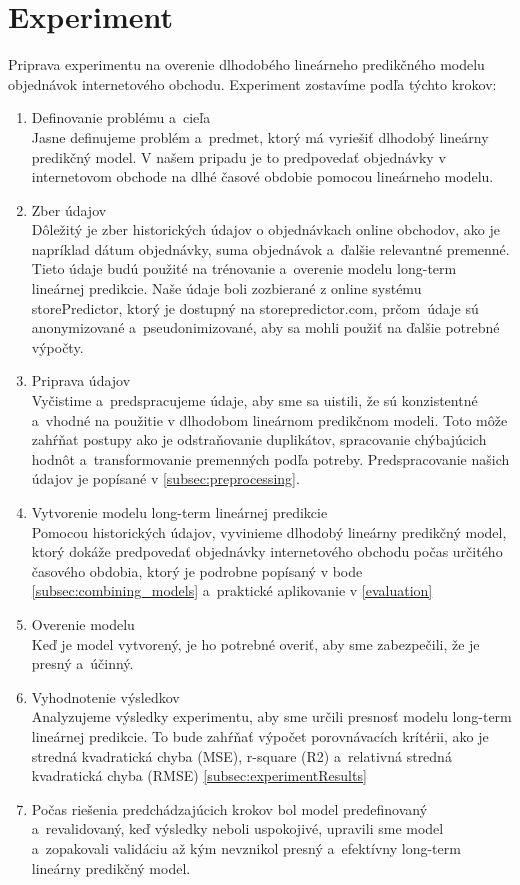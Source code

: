     \section{Experiment}
    Priprava experimentu na overenie dlhodobého lineárneho predikčného modelu objednávok internetového obchodu.
    Experiment zostavíme podľa týchto krokov:
    \begin{enumerate}
        \item Definovanie problému a~cieľa\\
        Jasne definujeme problém a~predmet, ktorý má vyriešiť dlhodobý lineárny\\ predikčný model.
        V našem pripadu je to predpovedať objednávky v internetovom obchode na dlhé časové obdobie
        pomocou lineárneho modelu.
        \item  Zber údajov\\
        Dôležitý je zber historických údajov o objednávkach online obchodov, ako je napríklad
        dátum objednávky, suma objednávok a~ďalšie relevantné premenné. Tieto údaje budú použité na trénovanie a~overenie
        modelu long-term lineárnej predikcie. Naše údaje boli zozbierané z online systému storePredictor,
        ktorý je dostupný na storepredictor.com, prčom~údaje sú anonymizované a~pseudonimizované, aby sa mohli použiť
        na ďalšie potrebné výpočty.
        \item  Priprava údajov\\
        Vyčistime a~predspracujeme údaje, aby sme sa uistili, že sú konzistentné a~vhodné na
        použitie v dlhodobom lineárnom predikčnom modeli. Toto môže zahŕňat postupy ako je odstraňovanie duplikátov,
        spracovanie chýbajúcich hodnôt a~transformovanie premenných podľa potreby. Predspracovanie našich údajov
        je popísané v \ref{subsec:preprocessing}.
        \item  Vytvorenie modelu long-term lineárnej predikcie\\
        Pomocou historických údajov, vyvinieme dlhodobý lineárny predikčný model, ktorý dokáže predpovedať
        objednávky internetového obchodu počas určitého časového obdobia, ktorý je podrobne popísaný v bode \ref{subsec:combining_models} a~praktické
        aplikovanie v \ref{evaluation}
        \item  Overenie modelu\\
        Keď je model vytvorený, je ho potrebné overiť, aby sme zabezpečili, že je presný a~účinný.
        \item Vyhodnotenie výsledkov\\
        Analyzujeme výsledky experimentu, aby sme určili presnosť modelu long-term lineárnej
        predikcie. To bude zahŕňať výpočet porovnávacích krítérii, ako je stredná kvadratická chyba (MSE), r-square (R2) a~relativná stredná
        kvadratická chyba (RMSE) \ref{subsec:experimentResults}
        \item Počas riešenia predchádzajúcich krokov bol model predefinovaný a~revalidovaný, keď výsledky neboli uspokojivé,
        upravili sme model a~zopakovali validáciu až kým nevznikol presný a~efektívny long-term lineárny predikčný model.
    \end{enumerate}

